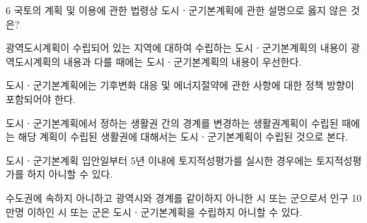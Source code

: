 \begin{question}{6}
국토의 계획 및 이용에 관한 법령상 도시ㆍ군기본계획에 관한 설명으로 옳지 않은 것은?
\begin{choices}
  \item 광역도시계획이 수립되어 있는 지역에 대하여 수립하는 도시ㆍ군기본계획의 내용이 광역도시계획의 내용과 다를 때에는 도시ㆍ군기본계획의 내용이 우선한다.
  \item 도시ㆍ군기본계획에는 기후변화 대응 및 에너지절약에 관한 사항에 대한 정책 방향이 포함되어야 한다.
  \item 도시ㆍ군기본계획에서 정하는 생활권 간의 경계를 변경하는 생활권계획이 수립된 때에는 해당 계획이 수립된 생활권에 대해서는 도시ㆍ군기본계획이 수립된 것으로 본다.
  \item 도시ㆍ군기본계획 입안일부터 5년 이내에 토지적성평가를 실시한 경우에는 토지적성평가를 하지 아니할 수 있다.
  \item 수도권에 속하지 아니하고 광역시와 경계를 같이하지 아니한 시 또는 군으로서 인구 10만명 이하인 시 또는 군은 도시ㆍ군기본계획을 수립하지 아니할 수 있다.
\end{choices}
\end{question}
